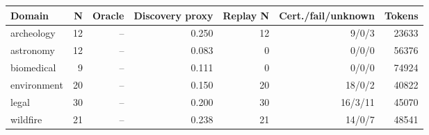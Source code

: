 \begin{tabular}{lrrrrrr}
\toprule
Domain & N & Oracle & Discovery proxy & Replay N & Cert./fail/unknown & Tokens \\
\midrule
archeology & 12 & -- & 0.250 & 12 & 9/0/3 & 23633 \\
astronomy & 12 & -- & 0.083 & 0 & 0/0/0 & 56376 \\
biomedical & 9 & -- & 0.111 & 0 & 0/0/0 & 74924 \\
environment & 20 & -- & 0.150 & 20 & 18/0/2 & 40822 \\
legal & 30 & -- & 0.200 & 30 & 16/3/11 & 45070 \\
wildfire & 21 & -- & 0.238 & 21 & 14/0/7 & 48541 \\
\bottomrule
\end{tabular}

